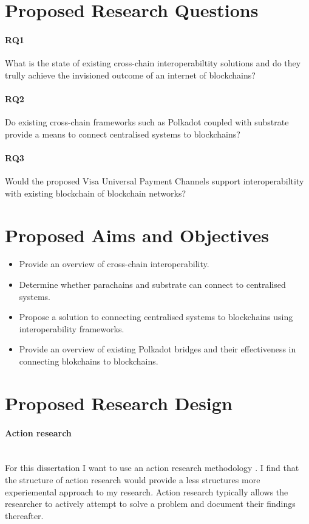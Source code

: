 \documentclass[12pt]{article}
\begin{document}
\section{Proposed Research Questions}
\paragraph{RQ1} What is the state of existing cross-chain interoperabiltity solutions and do they trully achieve the invisioned outcome of an internet of blockchains?
\paragraph{RQ2} Do existing cross-chain frameworks such as Polkadot coupled with substrate provide a means to connect centralised systems to blockchains?
\paragraph{RQ3} Would the proposed Visa Universal Payment Channels support interoperabiltity with existing blockchain of blockchain networks?

\section{Proposed Aims and Objectives}
\begin{itemize}
    \item Provide an overview of cross-chain interoperability.
    \item Determine whether parachains and substrate can connect to centralised systems.
    \item Propose a solution to connecting centralised systems to blockchains using interoperability frameworks.
    \item Provide an overview of existing Polkadot bridges and their effectiveness in connecting blokchains to blockchains.
\end{itemize}

\section{Proposed Research Design}
\paragraph{Action research}\mbox{} \\
For this dissertation I want to use an action research methodology \autocite{10.5555/2842927}. I find that the structure of action research would provide a
less structures more experiemental approach to my research. Action research typically allows the researcher to actively attempt to solve a problem and document their findings thereafter.
\end{document}
